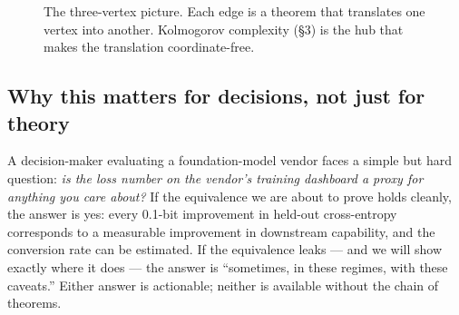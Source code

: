 \documentclass[12pt,a4paper]{article}
\theoremstyle{plain}
\theoremstyle{definition}
\begin{document}
\begin{figure}[h]
\centering
{}
\caption{The three-vertex picture. Each edge is a theorem that
translates one vertex into another. Kolmogorov complexity
(\S3) is the hub that makes the translation coordinate-free.}
\label{fig:triangle}
\end{figure}

\subsection*{Why this matters for decisions, not just for theory}

A decision-maker evaluating a foundation-model vendor faces a
simple but hard question: \emph{is the loss number on the vendor's
training dashboard a proxy for anything you care about?} If the
equivalence we are about to prove holds cleanly, the answer is yes:
every 0.1-bit improvement in held-out cross-entropy corresponds to
a measurable improvement in downstream capability, and the
conversion rate can be estimated. If the equivalence leaks --- and
we will show exactly where it does --- the answer is ``sometimes,
in these regimes, with these caveats.'' Either answer is
actionable; neither is available without the chain of theorems.
\end{document}
